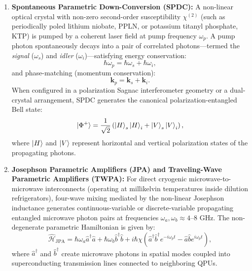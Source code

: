 \begin{enumerate}
    \item \textbf{Spontaneous Parametric Down-Conversion (SPDC):} A non-linear optical crystal with non-zero second-order susceptibility $\chi^{(2)}$ (such as periodically poled lithium niobate, PPLN, or potassium titanyl phosphate, KTP) is pumped by a coherent laser field at pump frequency $\omega_p$. A pump photon spontaneously decays into a pair of correlated photons---termed the \textit{signal} ($\omega_s$) and \textit{idler} ($\omega_i$)---satisfying energy conservation:
    \begin{equation}
        \hbar \omega_p = \hbar \omega_s + \hbar \omega_i,
        \label{eq:spdc_energy_cons_ch3}
    \end{equation}
    and phase-matching (momentum conservation):
    \begin{equation}
        \bm{k}_p = \bm{k}_s + \bm{k}_i.
        \label{eq:spdc_momentum_cons_ch3}
    \end{equation}
    When configured in a polarization Sagnac interferometer geometry or a dual-crystal arrangement, SPDC generates the canonical polarization-entangled Bell state:
    \begin{equation}
        \ket{\Phi^+} = \frac{1}{\sqrt{2}} \left( \ket{H}_s \ket{H}_i + \ket{V}_s \ket{V}_i \right),
        \label{eq:spdc_bell_state_ch3}
    \end{equation}
    where $\ket{H}$ and $\ket{V}$ represent horizontal and vertical polarization states of the propagating photons.
    
    \item \textbf{Josephson Parametric Amplifiers (JPA) and Traveling-Wave Parametric Amplifiers (TWPA):} For direct cryogenic microwave-to-microwave interconnects (operating at millikelvin temperatures inside dilution refrigerators), four-wave mixing mediated by the non-linear Josephson inductance generates continuous-variable or discrete-variable propagating entangled microwave photon pairs at frequencies $\omega_a, \omega_b \approx 4\text{--}8\text{ GHz}$. The non-degenerate parametric Hamiltonian is given by:
    \begin{equation}
        \hat{\mathcal{H}}_{\text{JPA}} = \hbar \omega_a \hat{a}^\dagger \hat{a} + \hbar \omega_b \hat{b}^\dagger \hat{b} + i \hbar \chi \left( \hat{a}^\dagger \hat{b}^\dagger e^{-i \omega_p t} - \hat{a} \hat{b} e^{i \omega_p t} \right),
        \label{eq:jpa_hamiltonian_ch3}
    \end{equation}
    where $\hat{a}^\dagger$ and $\hat{b}^\dagger$ create microwave photons in spatial modes coupled into superconducting transmission lines connected to neighboring QPUs.
\end{enumerate}

